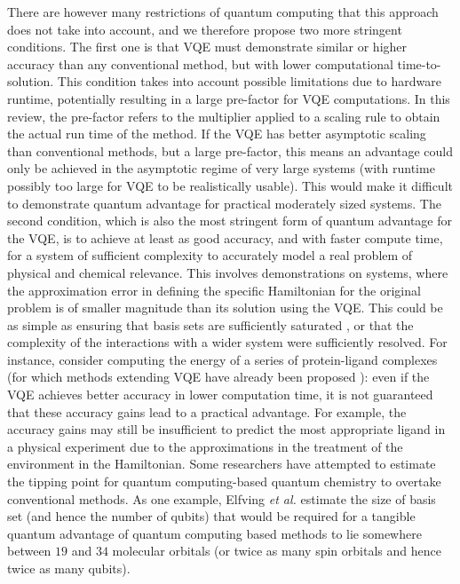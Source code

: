 There are however many restrictions of quantum computing that this approach does not take into account, and we therefore propose two more stringent conditions. The first one is that VQE must demonstrate similar or higher accuracy than any conventional method, but with lower computational time-to-solution. This condition takes into account possible limitations due to hardware runtime, potentially resulting in a large pre-factor for VQE computations. In this review, the pre-factor refers to the multiplier applied to a scaling rule to obtain the actual run time of the method. If the VQE has better asymptotic scaling than conventional methods, but a large pre-factor, this means an advantage could only be achieved in the asymptotic regime of very large systems (with runtime possibly too large for VQE to be realistically usable). This would make it difficult to demonstrate quantum advantage for practical moderately sized systems. The second condition, which is also the most stringent form of quantum advantage for the VQE, is to achieve at least as good accuracy, and with faster compute time, for a system of sufficient complexity to accurately model a real problem of physical and chemical relevance. This involves demonstrations on systems, where the approximation error in defining the specific Hamiltonian for the original problem is of smaller magnitude than its solution using the VQE. This could be as simple as ensuring that basis sets are sufficiently saturated \cite{Jensen2017}, or that the complexity of the interactions with a wider system were sufficiently resolved. For instance, consider computing the energy of a series of protein-ligand complexes (for which methods extending VQE have already been proposed \cite{Malone2021, Kirsopp2021}): even if the VQE achieves better accuracy in lower computation time, it is not guaranteed that these accuracy gains lead to a practical advantage. For example, the accuracy gains may still be insufficient to predict the most appropriate ligand in a physical experiment due to the approximations in the treatment of the environment in the Hamiltonian. Some researchers have attempted to estimate the tipping point for quantum computing-based quantum chemistry to overtake conventional methods. As one example, Elfving {\it et al.} \cite{Elfving2020} estimate the size of basis set (and hence the number of qubits) that would be required for a tangible quantum advantage of quantum computing based methods to lie somewhere between $19$ and $34$ molecular orbitals (or twice as many spin orbitals and hence twice as many qubits).


